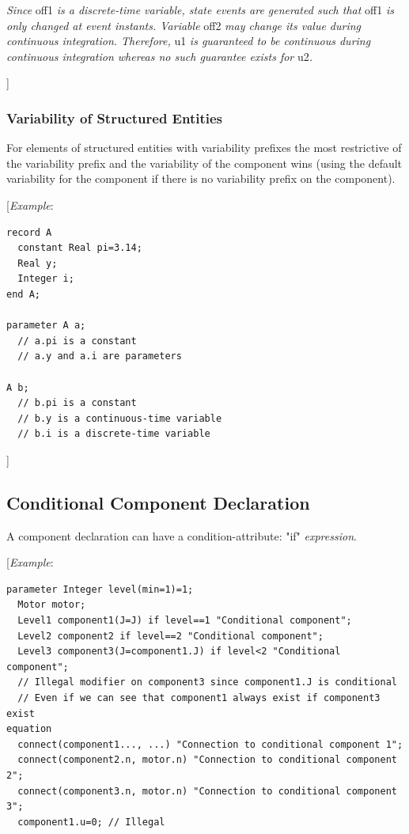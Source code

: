 \documentclass[10pt,a4paper]{report}
\def\doublelabel#1{\label{#1}}
\begin{document}
\emph{Since} off1 \emph{is a discrete-time variable, state events are
generated such that} off1 \emph{is only changed at event instants.
Variable} off2 \emph{may change its value during continuous integration.
Therefore,} u1 \emph{is guaranteed to be continuous during continuous
integration whereas no such guarantee exists for} u2\emph{.}

{]}

\subsubsection{Variability of Structured Entities}\doublelabel{variability-of-structured-entities}

For elements of structured entities with variability prefixes the most
restrictive of the variability prefix and the variability of the
component wins (using the default variability for the component if there
is no variability prefix on the component).

{[}\emph{Example}:
\begin{lstlisting}[language=modelica]
record A
  constant Real pi=3.14;
  Real y;
  Integer i;
end A;

parameter A a;
  // a.pi is a constant
  // a.y and a.i are parameters
  
A b;
  // b.pi is a constant
  // b.y is a continuous-time variable
  // b.i is a discrete-time variable
\end{lstlisting}

{]}

\subsection{Conditional Component Declaration}\doublelabel{conditional-component-declaration}

A component declaration can have a condition-attribute: "if"
\emph{expression}.

{[}\emph{Example}:
\begin{lstlisting}[language=modelica]
  parameter Integer level(min=1)=1;
  Motor motor;
  Level1 component1(J=J) if level==1 "Conditional component";
  Level2 component2 if level==2 "Conditional component";
  Level3 component3(J=component1.J) if level<2 "Conditional component";
  // Illegal modifier on component3 since component1.J is conditional
  // Even if we can see that component1 always exist if component3 exist
equation
  connect(component1..., ...) "Connection to conditional component 1";
  connect(component2.n, motor.n) "Connection to conditional component 2";
  connect(component3.n, motor.n) "Connection to conditional component 3";
  component1.u=0; // Illegal
\end{lstlisting}
\end{document}
